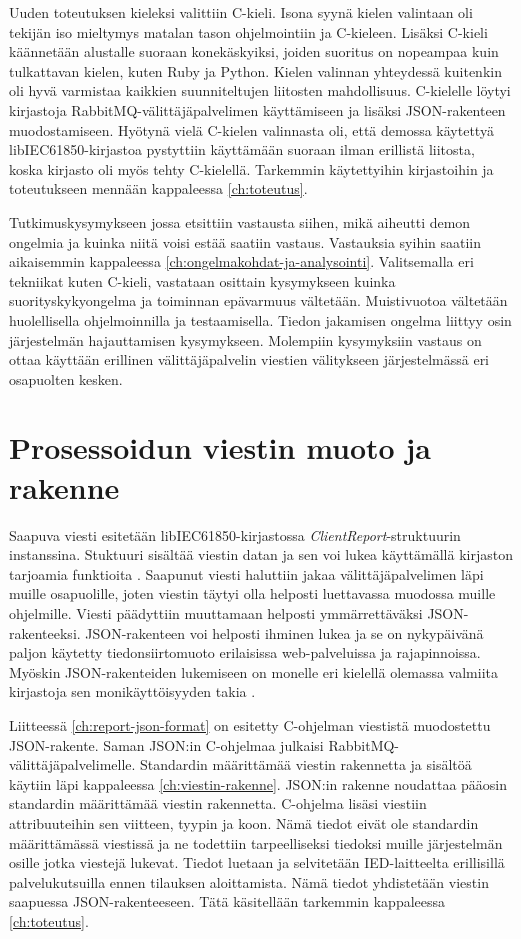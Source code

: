 Uuden toteutuksen kieleksi valittiin C-kieli. Isona syynä kielen valintaan oli tekijän iso mieltymys matalan tason ohjelmointiin ja C-kieleen. Lisäksi C-kieli käännetään alustalle suoraan konekäskyiksi, joiden suoritus on nopeampaa kuin tulkattavan kielen, kuten Ruby ja Python. Kielen valinnan yhteydessä kuitenkin oli hyvä varmistaa kaikkien suunniteltujen liitosten mahdollisuus. C-kielelle löytyi kirjastoja RabbitMQ-välittäjäpalvelimen käyttämiseen ja lisäksi JSON-rakenteen muodostamiseen. Hyötynä vielä C-kielen valinnasta oli, että demossa käytettyä libIEC61850-kirjastoa pystyttiin käyttämään suoraan ilman erillistä liitosta, koska kirjasto oli myös tehty C-kielellä. Tarkemmin käytettyihin kirjastoihin ja toteutukseen mennään kappaleessa \ref{ch:toteutus}.

Tutkimuskysymykseen jossa etsittiin vastausta siihen, mikä aiheutti demon ongelmia ja kuinka niitä voisi estää saatiin vastaus. Vastauksia syihin saatiin aikaisemmin kappaleessa \ref{ch:ongelmakohdat-ja-analysointi}. Valitsemalla eri tekniikat kuten C-kieli, vastataan osittain kysymykseen kuinka suorityskykyongelma ja toiminnan epävarmuus vältetään. Muistivuotoa vältetään huolellisella ohjelmoinnilla ja testaamisella. Tiedon jakamisen ongelma liittyy osin järjestelmän hajauttamisen kysymykseen. Molempiin kysymyksiin vastaus on ottaa käyttään erillinen välittäjäpalvelin viestien välitykseen järjestelmässä eri osapuolten kesken.


\section{Prosessoidun viestin muoto ja rakenne}
Saapuva viesti esitetään libIEC61850-kirjastossa \emph{ClientReport}-struktuurin instanssina. Stuktuuri sisältää viestin datan ja sen voi lukea käyttämällä kirjaston tarjoamia funktioita \mbox{\cite{libIEC61850-doc}}. Saapunut viesti haluttiin jakaa välittäjäpalvelimen läpi muille osapuolille, joten viestin täytyi olla helposti luettavassa muodossa muille ohjelmille. Viesti päädyttiin muuttamaan helposti ymmärrettäväksi JSON-rakenteeksi. JSON-rakenteen voi helposti ihminen lukea ja se on nykypäivänä paljon käytetty tiedonsiirtomuoto erilaisissa web-palveluissa ja rajapinnoissa. Myöskin JSON-rakenteiden lukemiseen on monelle eri kielellä olemassa valmiita kirjastoja sen monikäyttöisyyden takia \mbox{\cite{Patrizio2016}}.

Liitteessä \ref{ch:report-json-format} on esitetty C-ohjelman viestistä muodostettu JSON-rakente. Saman JSON:in C-ohjelmaa julkaisi RabbitMQ-välittäjäpalvelimelle. Standardin määrittämää viestin rakennetta ja sisältöä käytiin läpi kappaleessa \ref{ch:viestin-rakenne}. JSON:in rakenne noudattaa pääosin standardin määrittämää viestin rakennetta. C-ohjelma lisäsi viestiin attribuuteihin sen viitteen, tyypin ja koon. Nämä tiedot eivät ole standardin määrittämässä viestissä ja ne todettiin tarpeelliseksi tiedoksi muille järjestelmän osille jotka viestejä lukevat. Tiedot luetaan ja selvitetään IED-laitteelta erillisillä palvelukutsuilla ennen tilauksen aloittamista. Nämä tiedot yhdistetään viestin saapuessa JSON-rakenteeseen. Tätä käsitellään tarkemmin kappaleessa \ref{ch:toteutus}.

